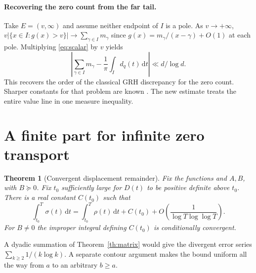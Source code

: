 \documentclass[11pt]{article}
\newtheorem{theorem}{Theorem}
\newcommand{\dd}{\,\mathrm d}\newcommand{\ii}{\mathrm i}
\begin{document}
\paragraph{Recovering the zero count from the far tail.}
Take $E=(v,\infty)$ and assume neither endpoint of $I$ is a pole. As $v\to+\infty$, $v|\{x\in I:g(x)>v\}|\to\sum_{\gamma\in I}m_\gamma$ since $g(x)=m_\gamma/(x-\gamma)+O(1)$ at each pole. Multiplying \eqref{eq:scalar} by $v$ yields
\[
 \left|\sum_{\gamma\in I}m_\gamma-\frac1\pi\int_I d_q(t)\dd t\right|\ll d/\log d.
\]
This recovers the order of the classical GRH discrepancy for the zero count. Sharper constants for that problem are known \cite{ccm}. The new estimate treats the entire value line in one measure inequality.

\clearpage
\section{A finite part for infinite zero transport}
\begin{theorem}[Convergent displacement remainder]\label{th:global}
Fix the functions and $A,B$, with $B\succeq0$. Fix $t_0$ sufficiently large for $D(t)$ to be positive definite above $t_0$. There is a real constant $C(t_0)$ such that
\begin{equation}\label{eq:global}
 \int_{t_0}^T \sigma(t)\dd t
   =\int_{t_0}^T \rho(t)\dd t+C(t_0)
      +O\left(\frac1{\log T\log\log T}\right).
\end{equation}
For $B\ne0$ the improper integral defining $C(t_0)$ is conditionally convergent.
\end{theorem}

A dyadic summation of Theorem~\ref{th:matrix} would give the divergent error series $\sum_{k\ge2}1/(k\log k)$. A separate contour argument makes the bound uniform all the way from $a$ to an arbitrary $b\ge a$.
\end{document}
